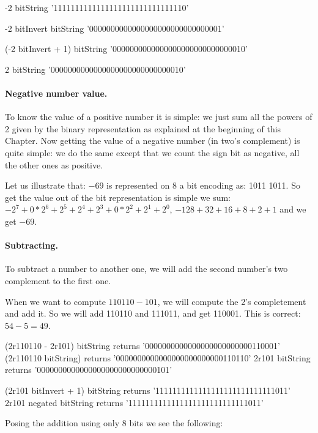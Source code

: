 \documentclass[a4paper,10pt,twoside]{book}
\begin{document}
\begin{code}{}
-2 bitString 
	'1111111111111111111111111111110'
	
-2 bitInvert bitString  
	'0000000000000000000000000000001'
	
(-2 bitInvert + 1) bitString   
	'0000000000000000000000000000010'

2 bitString 
	'0000000000000000000000000000010'
\end{code}

\paragraph{Negative number value.}
To know the value of a positive number it is simple: we just sum all the powers of 2 given by the binary representation as explained at the beginning of this Chapter. Now getting the value of a negative number (in two's complement) is quite simple: we do the same except that we count the sign bit as negative, all the other ones as positive. 

Let us illustrate that: 
$-69$ is represented on 8 a bit encoding as: 1011 1011. So get the value out of the bit representation is simple we sum: $-2^7 + 0*2^6 + 2^5 + 2^4 + 2^3 + 0*2^2 + 2^1 + 2^0$, \ie $-128 + 32 + 16 + 8 + 2 + 1$ and we get $-69$. 



\paragraph{Subtracting.}
To subtract a number to another one, we will add the second number's two complement to the first one.

When we want to compute $110110 - 101$, we will compute the 2's completement and add it. 
So we will add 110110 and 111011, and get 110001. This is correct: $54 - 5 = 49$.

\begin{code}{}
(2r110110 - 2r101) bitString	
	returns '0000000000000000000000000110001'
(2r110110 bitString) 	
	returns '0000000000000000000000000110110'
2r101 bitString
	returns '0000000000000000000000000000101'		
							
(2r101 bitInvert + 1) bitString
	returns '1111111111111111111111111111011'	
2r101 negated bitString
	returns '1111111111111111111111111111011'	
\end{code}
	
Posing the addition using only 8 bits we see the following:
\end{document}
